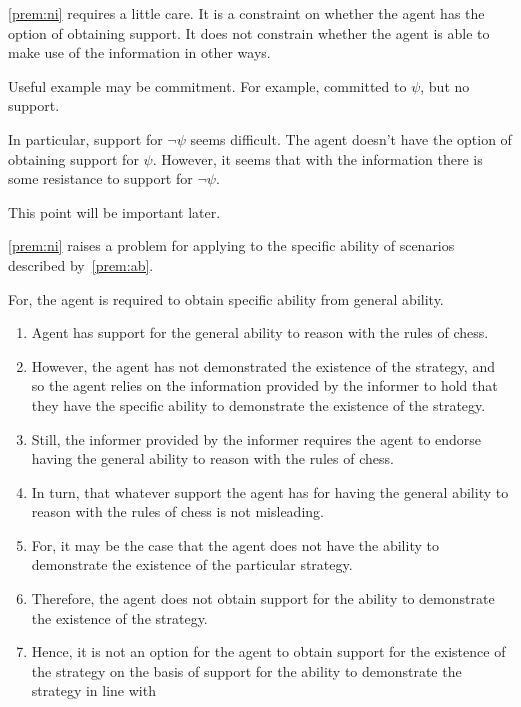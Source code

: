 \begin{note}
  \ref{prem:ni} requires a little care.
  It is a constraint on whether the agent has the option of obtaining support.
  It does not constrain whether the agent is able to make use of the information in other ways.

  Useful example may be commitment.
  For example, committed to \(\psi\), but no support.

  In particular, support for \(\lnot\psi\) seems difficult.
  The agent doesn't have the option of obtaining support for \(\psi\).
  However, it seems that with the information there is some resistance to support for \(\lnot\psi\).

  This point will be important later.
\end{note}

\begin{note}
  \ref{prem:ni} raises a problem for applying \AR{} to the specific ability of scenarios described by~\ref{prem:ab}.

  For, the agent is required to obtain specific ability from general ability.
  \begin{enumerate}
  \item Agent has support for the general ability to reason with the rules of chess.
  \item However, the agent has not demonstrated the existence of the strategy, and so the agent relies on the information provided by the informer to hold that they have the specific ability to demonstrate the existence of the strategy.
  \item Still, the informer provided by the informer requires the agent to endorse having the general ability to reason with the rules of chess.
  \item In turn, that whatever support the agent has for having the general ability to reason with the rules of chess is not misleading.
  \item For, it may be the case that the agent does not have the ability to demonstrate the existence of the particular strategy.
  \item Therefore, the agent does not obtain support for the ability to demonstrate the existence of the strategy.
  \item Hence, it is not an option for the agent to obtain support for the existence of the strategy on the basis of support for the ability to demonstrate the strategy in line with \AR{}
  \end{enumerate}
\end{note}

